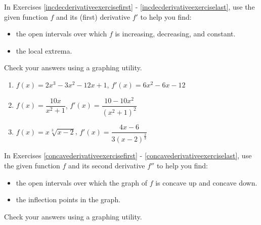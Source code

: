 \label{ExercisesforAppDerivatives}


In Exercises \ref{incdecderivativeexercisefirst} - \ref{incdecderivativeexerciselast},  use the given function $f$ and its (first) derivative $f'$ to help you find:

\begin{itemize}

\item the open intervals over which $f$ is increasing, decreasing, and constant.

\item the local extrema.

\end{itemize}

Check your answers using a graphing utility.

\begin{enumerate}

\item\label{incdecderivativeexercisefirst} $f(x) = 2x^{3}-3x^{2}-12x + 1$, $f'(x) = 6x^2-6x-12$ %

\smallskip

\item $f(x) = \dfrac{10x}{x^2+1}$, $f'(x) = \dfrac{10-10x^2}{\left(x^2+1\right)^2}$ %

\smallskip

\item\label{incdecderivativeexerciselast} $f(x) = x \sqrt[3]{x-2}$, $f'(x)=\dfrac{4x-6}{3(x-2)^{\frac{2}{3}}}$ %

\smallskip

\setcounter{HW}{\value{enumi}}
\end{enumerate}

In Exercises \ref{concavederivativeexercisefirst} - \ref{concavederivativeexerciselast},  use the given function $f$ and its second derivative $f''$ to help you find:

\begin{itemize}

\item  the open intervals over which the graph of $f$ is concave up and concave down.

\item  the inflection points in the graph.

\end{itemize}

Check your answers using a graphing utility.


